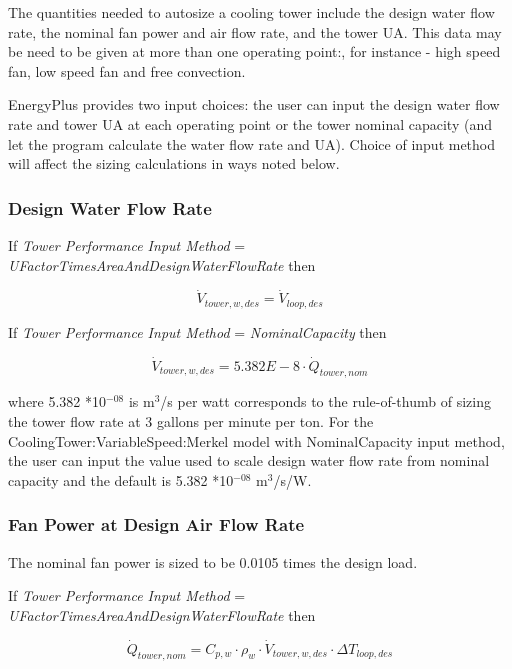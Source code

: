 The quantities needed to autosize a cooling tower include the design water flow rate, the nominal fan power and air flow rate, and the tower UA. This data may be need to be given at more than one operating point:, for instance - high speed fan, low speed fan and free convection.

EnergyPlus provides two input choices: the user can input the design water flow rate and tower UA at each operating point or the tower nominal capacity (and let the program calculate the water flow rate and UA). Choice of input method will affect the sizing calculations in ways noted below.

\subsubsection{Design Water Flow Rate}\label{design-water-flow-rate}

If \emph{Tower Performance Input Method} = \emph{UFactorTimesAreaAndDesignWaterFlowRate} then

\begin{equation}
\dot V_{tower,w,des} = \dot V_{loop,des}
\end{equation}

If \emph{Tower Performance Input Method} = \emph{NominalCapacity} then

\begin{equation}
\dot V_{tower,w,des} = 5.382E - 8\cdot \dot Q_{tower,nom}
\end{equation}

where 5.382 *10\(^{-08}\) is m\(^{3}\)/s per watt corresponds to the rule-of-thumb of sizing the tower flow rate at 3 gallons per minute per ton. For the CoolingTower:VariableSpeed:Merkel model with NominalCapacity input method, the user can input the value used to scale design water flow rate from nominal capacity and the default is 5.382 *10\(^{-08}\) m\(^{3}\)/s/W.

\subsubsection{Fan Power at Design Air Flow Rate}\label{fan-power-at-design-air-flow-rate}

The nominal fan power is sized to be 0.0105 times the design load.

If \emph{Tower Performance Input Method} = \emph{UFactorTimesAreaAndDesignWaterFlowRate} then

\begin{equation}
\dot Q_{tower,nom} = C_{p,w} \cdot \rho_{w} \cdot \dot V_{tower,w,des} \cdot \Delta T_{loop,des}
\end{equation}

